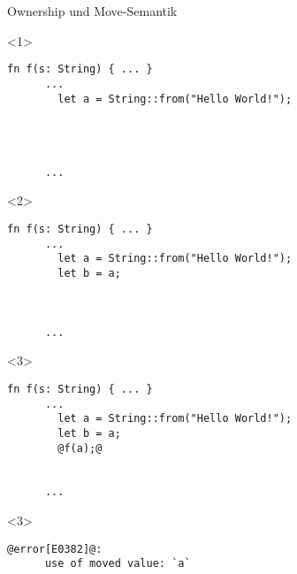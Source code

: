 

\lstset{showstringspaces=true,columns=fullflexible,keepspaces=true}

\begin{frame}[fragile]{Ownership und Move-Semantik}


  \begin{onlyenv}<1> {
    \begin{lstlisting}[frame=single,style=base]
      fn f(s: String) { ... }
      ...
        let a = String::from("Hello World!");




      ...\end{lstlisting}
  }
  \end{onlyenv}


  \begin{onlyenv}<2> {
    \begin{lstlisting}[frame=single,style=base]
      fn f(s: String) { ... }
      ...
        let a = String::from("Hello World!");
        let b = a;



      ...\end{lstlisting}
  }
  \end{onlyenv}


  \begin{onlyenv}<3> {
    \begin{lstlisting}[frame=single,style=base]
      fn f(s: String) { ... }
      ...
        let a = String::from("Hello World!");
        let b = a;
        @f(a);@


      ...\end{lstlisting}
  }
  \end{onlyenv}

  \begin{onlyenv}<3> {
    \begin{lstlisting}[frame=single,style=base]
      @error[E0382]@:
      use of moved value: `a`\end{lstlisting}
  }
  \end{onlyenv}


\end{frame}

